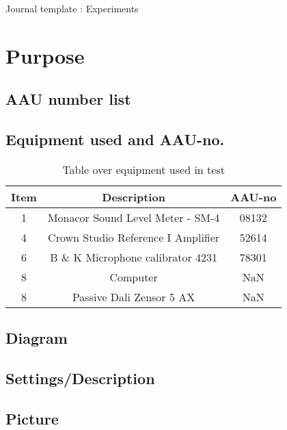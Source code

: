 \documentclass[12pt,a4paper]{article}
\newcommand{\ra}[1]{\renewcommand{\arraystretch}{#1}}
\begin{document}
\begin{Huge}
\begin{center}
Journal template : Experiments
\end{center}
\end{Huge}


\vspace{1cm}
\section{Purpose}
\subsection{AAU number list}

\subsection{Equipment used and AAU-no.}

\begin{table}[h]
	\centering
	\ra{1.3}
	\begin{tabular}{ c c c } \toprule
		{Item} & {Description} & {AAU-no} \\ \bottomrule 
		1      &  Monacor Sound Level Meter - SM-4      & 08132   \\
		4      &  Crown Studio Reference I Amplifier    & 52614   \\
		6      &  B \& K Microphone calibrator 4231     & 78301   \\
		8      &  Computer                              & NaN     \\  
		8      &  Passive Dali Zensor 5 AX              & NaN     \\ \bottomrule 
	\end{tabular}
	\caption{Table over equipment used in test}
	\label{tab:UsedEquipmentListning}
\end{table}

\subsection{Diagram}
\subsection{Settings/Description}
\subsection{Picture}
\vspace{1cm}
\end{document}
